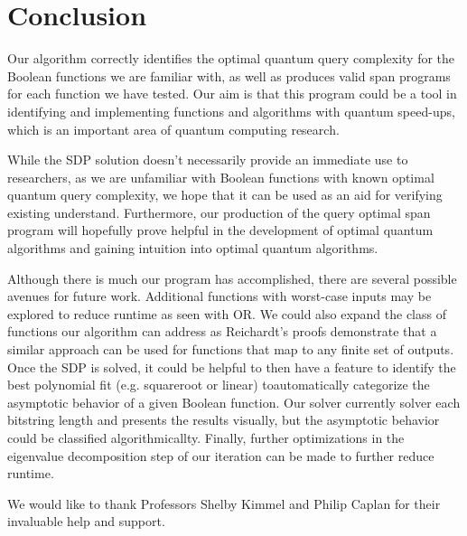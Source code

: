 \section{Conclusion}
Our algorithm correctly identifies the optimal
quantum query complexity for the Boolean functions
we are familiar with, as well as produces valid span
programs for each function we have tested. Our aim is that this program could be a tool in identifying and implementing functions and algorithms with 
quantum speed-ups, which is an important area
of quantum computing research.

While the SDP solution doesn't necessarily provide an immediate use to researchers, as we are unfamiliar with Boolean functions with known optimal quantum query complexity, we hope that it can be used as an aid for verifying existing understand. Furthermore, our production of the query optimal span program will hopefully prove helpful in the development of
optimal quantum algorithms and gaining intuition into optimal quantum algorithms.

Although there is much our program has accomplished, there are several possible avenues for future work. Additional functions with worst-case
inputs may be explored to reduce runtime as seen with OR. We could also expand the class of functions our algorithm can address as Reichardt's proofs demonstrate that a similar approach can be used for functions that map to any finite set of outputs.
Once the SDP is solved, it could be helpful to then have a feature to identify the best polynomial
fit (e.g. squareroot or linear) toautomatically categorize the asymptotic behavior
of a given Boolean function. Our solver currently solver each bitstring length and presents the results visually, but the asymptotic behavior could be classified algorithmicallty.
Finally, further optimizations in the
eigenvalue decomposition step of our iteration
can be made to further reduce runtime.

\begin{acks}
We would like to thank Professors Shelby Kimmel
and Philip Caplan for their invaluable help and support. 
\end{acks}
